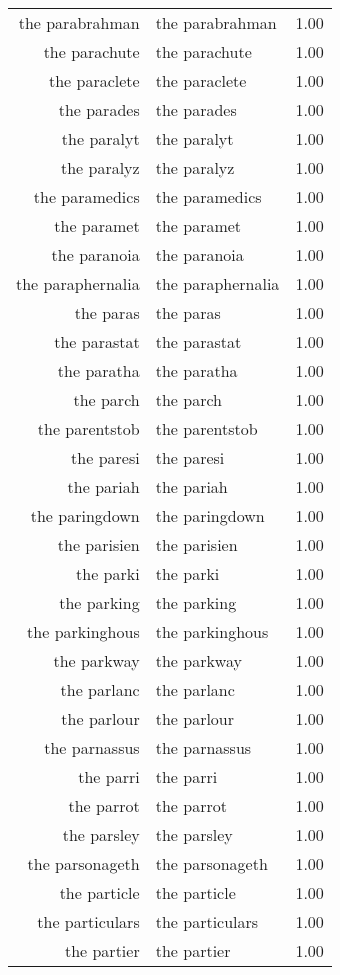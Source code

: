 \begin{table}[ht]
\begin{tabular}{rlr}
  the parabrahman & the parabrahman & 1.00 \\ 
  the parachute & the parachute & 1.00 \\ 
  the paraclete & the paraclete & 1.00 \\ 
  the parades & the parades & 1.00 \\ 
  the paralyt & the paralyt & 1.00 \\ 
  the paralyz & the paralyz & 1.00 \\ 
  the paramedics & the paramedics & 1.00 \\ 
  the paramet & the paramet & 1.00 \\ 
  the paranoia & the paranoia & 1.00 \\ 
  the paraphernalia & the paraphernalia & 1.00 \\ 
  the paras & the paras & 1.00 \\ 
  the parastat & the parastat & 1.00 \\ 
  the paratha & the paratha & 1.00 \\ 
  the parch & the parch & 1.00 \\ 
  the parentstob & the parentstob & 1.00 \\ 
  the paresi & the paresi & 1.00 \\ 
  the pariah & the pariah & 1.00 \\ 
  the paringdown & the paringdown & 1.00 \\ 
  the parisien & the parisien & 1.00 \\ 
  the parki & the parki & 1.00 \\ 
  the parking & the parking & 1.00 \\ 
  the parkinghous & the parkinghous & 1.00 \\ 
  the parkway & the parkway & 1.00 \\ 
  the parlanc & the parlanc & 1.00 \\ 
  the parlour & the parlour & 1.00 \\ 
  the parnassus & the parnassus & 1.00 \\ 
  the parri & the parri & 1.00 \\ 
  the parrot & the parrot & 1.00 \\ 
  the parsley & the parsley & 1.00 \\ 
  the parsonageth & the parsonageth & 1.00 \\ 
  the particle & the particle & 1.00 \\ 
  the particulars & the particulars & 1.00 \\ 
  the partier & the partier & 1.00 \\ 

\end{tabular}
\end{table}
